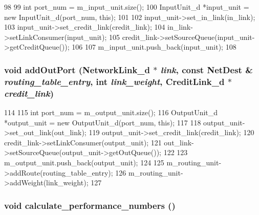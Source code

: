 \begin{DoxyCode}
98 {
99     int port_num = m_input_unit.size();
100     InputUnit_d *input_unit = new InputUnit_d(port_num, this);
101 
102     input_unit->set_in_link(in_link);
103     input_unit->set_credit_link(credit_link);
104     in_link->setLinkConsumer(input_unit);
105     credit_link->setSourceQueue(input_unit->getCreditQueue());
106 
107     m_input_unit.push_back(input_unit);
108 }
\end{DoxyCode}
\hypertarget{classRouter__d_a420e79fd219ef8937968b54800f4a710}{
\subsubsection[{addOutPort}]{\setlength{\rightskip}{0pt plus 5cm}void addOutPort ({\bf NetworkLink\_\-d} $\ast$ {\em link}, \/  const {\bf NetDest} \& {\em routing\_\-table\_\-entry}, \/  int {\em link\_\-weight}, \/  {\bf CreditLink\_\-d} $\ast$ {\em credit\_\-link})}}
\label{classRouter__d_a420e79fd219ef8937968b54800f4a710}



\begin{DoxyCode}
114 {
115     int port_num = m_output_unit.size();
116     OutputUnit_d *output_unit = new OutputUnit_d(port_num, this);
117 
118     output_unit->set_out_link(out_link);
119     output_unit->set_credit_link(credit_link);
120     credit_link->setLinkConsumer(output_unit);
121     out_link->setSourceQueue(output_unit->getOutQueue());
122 
123     m_output_unit.push_back(output_unit);
124 
125     m_routing_unit->addRoute(routing_table_entry);
126     m_routing_unit->addWeight(link_weight);
127 }
\end{DoxyCode}
\hypertarget{classRouter__d_ab129d2922a83d8fe29b465df6fc298b8}{
\subsubsection[{calculate\_\-performance\_\-numbers}]{\setlength{\rightskip}{0pt plus 5cm}void calculate\_\-performance\_\-numbers ()}}
\label{classRouter__d_ab129d2922a83d8fe29b465df6fc298b8}



